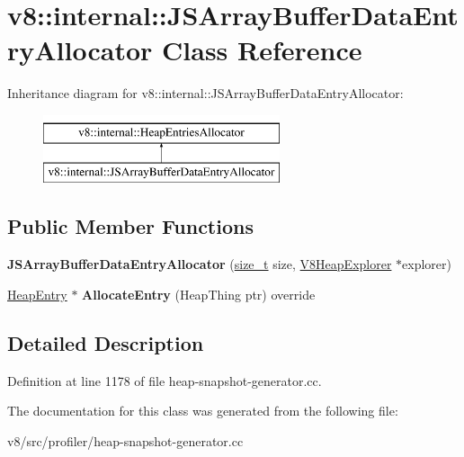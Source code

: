 \hypertarget{classv8_1_1internal_1_1JSArrayBufferDataEntryAllocator}{}\section{v8\+:\+:internal\+:\+:J\+S\+Array\+Buffer\+Data\+Entry\+Allocator Class Reference}
\label{classv8_1_1internal_1_1JSArrayBufferDataEntryAllocator}
Inheritance diagram for v8\+:\+:internal\+:\+:J\+S\+Array\+Buffer\+Data\+Entry\+Allocator\+:\begin{figure}[H]
\begin{center}
\leavevmode
\includegraphics[height=2.000000cm]{classv8_1_1internal_1_1JSArrayBufferDataEntryAllocator}
\end{center}
\end{figure}
\subsection*{Public Member Functions}
\begin{DoxyCompactItemize}
\item 
\mbox{\label{classv8_1_1internal_1_1JSArrayBufferDataEntryAllocator_a218f662ce481752a0a3f6593f570341a}} 
{\bfseries J\+S\+Array\+Buffer\+Data\+Entry\+Allocator} (\mbox{\hyperlink{classsize__t}{size\+\_\+t}} size, \mbox{\hyperlink{classv8_1_1internal_1_1V8HeapExplorer}{V8\+Heap\+Explorer}} $\ast$explorer)
\item 
\mbox{\label{classv8_1_1internal_1_1JSArrayBufferDataEntryAllocator_a20e60b515ca662fc7b63eebe3b35758e}} 
\mbox{\hyperlink{classv8_1_1internal_1_1HeapEntry}{Heap\+Entry}} $\ast$ {\bfseries Allocate\+Entry} (Heap\+Thing ptr) override
\end{DoxyCompactItemize}


\subsection{Detailed Description}


Definition at line 1178 of file heap-\/snapshot-\/generator.\+cc.



The documentation for this class was generated from the following file\+:\begin{DoxyCompactItemize}
\item 
v8/src/profiler/heap-\/snapshot-\/generator.\+cc\end{DoxyCompactItemize}
